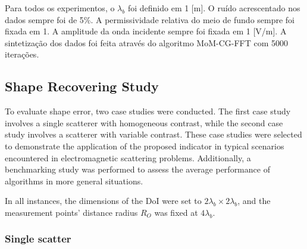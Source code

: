 \documentclass{IEEEtran}
\begin{document}
        Para todos os experimentos, o $\lambda_b$ foi definido em 1 [m]. O ruído acrescentado nos dados sempre foi de 5\%. A permissividade relativa do meio de fundo sempre foi fixada em 1. A amplitude da onda incidente sempre foi fixada em 1 [V/m]. A sintetização dos dados foi feita através do algoritmo MoM-CG-FFT \cite{su1987calculation} com 5000 iterações.
	
		\subsection{Shape Recovering Study}\label{sec:results:shape}
		

            To evaluate shape error, two case studies were conducted. The first case study involves a single scatterer with homogeneous contrast, while the second case study involves a scatterer with variable contrast. These case studies were selected to demonstrate the application of the proposed indicator in typical scenarios encountered in electromagnetic scattering problems. Additionally, a benchmarking study was performed to assess the average performance of algorithms in more general situations.
			

            In all instances, the dimensions of the DoI were set to $2\lambda_b\times2\lambda_b$, and the measurement points' distance radius $R_O$ was fixed at $4\lambda_b$.

			\subsubsection{Single scatter}\label{sec:results:shape:star}
\end{document}
